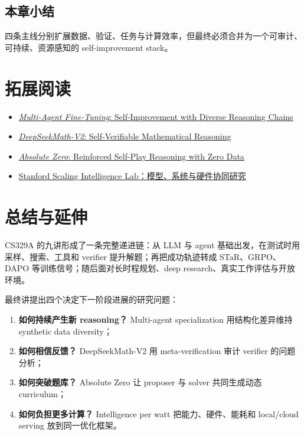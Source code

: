 \documentclass[a4paper]{article}
\begin{document}
\subsection{本章小结}

四条主线分别扩展数据、验证、任务与计算效率，但最终必须合并为一个可审计、可持续、资源感知的 self-improvement stack。

\section{拓展阅读}

\begin{itemize}
    \item \href{https://arxiv.org/search/?query=Multi-Agent+Fine-Tuning\&searchtype=all}{\emph{Multi-Agent Fine-Tuning}: Self-Improvement with Diverse Reasoning Chains}
    \item \href{https://arxiv.org/search/?query=DeepSeekMath-V2\&searchtype=all}{\emph{DeepSeekMath-V2}: Self-Verifiable Mathematical Reasoning}
    \item \href{https://arxiv.org/search/?query=Absolute+Zero+Reinforced+Self-play+Reasoning+with+Zero+Data\&searchtype=all}{\emph{Absolute Zero}: Reinforced Self-Play Reasoning with Zero Data}
    \item \href{https://scalingintelligence.stanford.edu/}{Stanford Scaling Intelligence Lab：模型、系统与硬件协同研究}
\end{itemize}

\section{总结与延伸}

CS329A 的九讲形成了一条完整递进链：从 LLM 与 agent 基础出发，在测试时用采样、搜索、工具和 verifier 提升解题；再把成功轨迹转成 STaR、GRPO、DAPO 等训练信号；随后面对长时程规划、deep research、真实工作评估与开放环境。

最终讲提出四个决定下一阶段进展的研究问题：

\begin{enumerate}
    \item \textbf{如何持续产生新 reasoning？} Multi-agent specialization 用结构化差异维持 synthetic data diversity；
    \item \textbf{如何相信反馈？} DeepSeekMath-V2 用 meta-verification 审计 verifier 的问题分析；
    \item \textbf{如何突破题库？} Absolute Zero 让 proposer 与 solver 共同生成动态 curriculum；
    \item \textbf{如何负担更多计算？} Intelligence per watt 把能力、硬件、能耗和 local/cloud serving 放到同一优化框架。
\end{enumerate}
\end{document}
